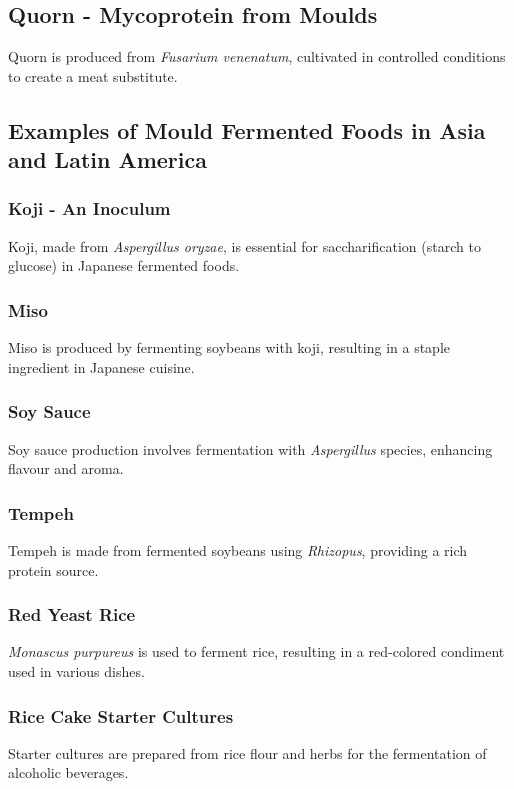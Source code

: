 \subsection*{Quorn - Mycoprotein from Moulds} 
Quorn is produced from \textit{Fusarium venenatum}, cultivated in controlled conditions to create a meat substitute.

\subsection*{Examples of Mould Fermented Foods in Asia and Latin America}

\subsubsection*{Koji - An Inoculum}
Koji, made from \textit{Aspergillus oryzae}, is essential for saccharification (starch to glucose) in Japanese fermented foods.

\subsubsection*{Miso}
Miso is produced by fermenting soybeans with koji, resulting in a staple ingredient in Japanese cuisine.

\subsubsection*{Soy Sauce}
Soy sauce production involves fermentation with \textit{Aspergillus} species, enhancing flavour and aroma.

\subsubsection*{Tempeh}
Tempeh is made from fermented soybeans using \textit{Rhizopus}, providing a rich protein source.

\subsubsection*{Red Yeast Rice}
\textit{Monascus purpureus}  is used to ferment rice, resulting in a red-colored condiment used in various dishes.

\subsubsection*{Rice Cake Starter Cultures}
Starter cultures are prepared from rice flour and herbs for the fermentation of alcoholic beverages.


